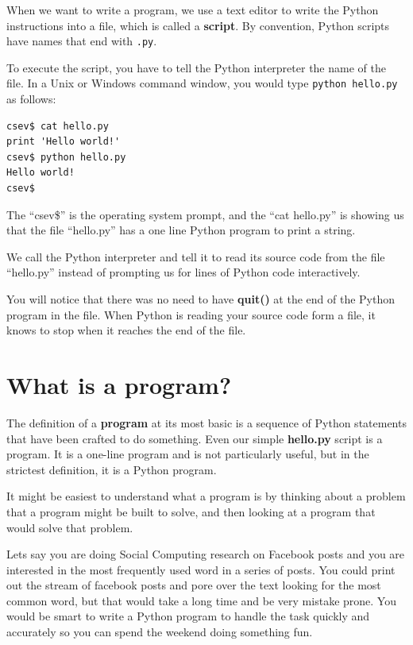 \documentclass[11pt]{book}
\begin{document}
When we want to write a program, 
we use a text editor to write the Python instructions into a file,
which is called a {\bf script}.  By
convention, Python scripts have names that end with {\tt .py}.


To execute the script, you have to tell the Python interpreter 
the name of the file.  In a Unix or Windows command window, 
you would type {\tt python hello.py} as follows:

\beforeverb
\begin{verbatim}
csev$ cat hello.py
print 'Hello world!'
csev$ python hello.py
Hello world!
csev$
\end{verbatim}
\afterverb
%
The ``csev\$'' is the operating system prompt, and the ``cat hello.py'' is 
showing us that the file ``hello.py'' has a one line Python program to print
a string.

We call the Python interpreter and tell it to read its source code from
the file ``hello.py'' instead of prompting us for lines of Python code
interactively.

You will notice that there was no need to have {\bf quit()} at the end of
the Python program in the file.   When Python is reading your source code
form a file, it knows to stop when it reaches the end of the file.

\section{What is a program?}

The definition of a {\bf program} at its most basic is a sequence
of Python statements that have been crafted to do something.
Even our simple {\bf hello.py} script is a program.  It is a one-line
program and is not particularly useful, but in the strictest definition,
it is a Python program.

It might be easiest to understand what a program is by thinking about a problem 
that a program might be built to solve, and then looking at a program
that would solve that problem.

Lets say you are doing Social Computing research on Facebook posts and 
you are interested in the most frequently used word in a series of posts.
You could print out the stream of facebook posts and pore over the text
looking for the most common word, but that would take a long time and be very 
mistake prone.  You would be smart to write a Python program to handle the
task quickly and accurately so you can spend the weekend doing something 
fun.
\end{document}
